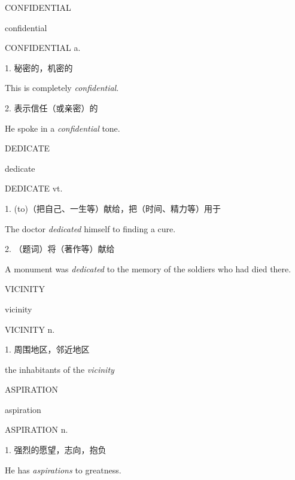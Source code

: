\begin{flashcard}{
CONFIDENTIAL

confidential
}
\begin{center}
CONFIDENTIAL a. 
\end{center}
1. 秘密的，机密的

This is completely \textit{confidential}.

2. 表示信任（或亲密）的

He spoke in a \textit{confidential} tone.

\end{flashcard}
\begin{flashcard}{
DEDICATE

dedicate
}
\begin{center}
DEDICATE vt. 
\end{center}
1. (to)（把自己、一生等）献给，把（时间、精力等）用于

The doctor \textit{dedicated} himself to finding a cure.

2. （题词）将（著作等）献给

A monument was \textit{dedicated} to the memory of the soldiers who had died there.

\end{flashcard}
\begin{flashcard}{
VICINITY

vicinity
}
\begin{center}
VICINITY n. 
\end{center}
1. 周围地区，邻近地区

the inhabitants of the \textit{vicinity}

\end{flashcard}
\begin{flashcard}{
ASPIRATION

aspiration
}
\begin{center}
ASPIRATION n. 
\end{center}
1. 强烈的愿望，志向，抱负

He has \textit{aspirations} to greatness.

\end{flashcard}
